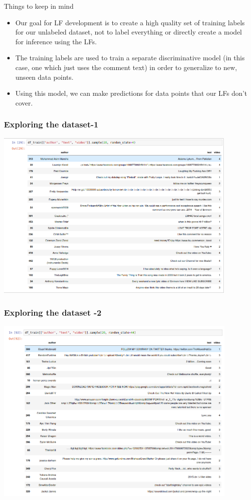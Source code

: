 \documentclass{beamer}
\begin{document}
\begin{frame}{Things to keep in mind}
    \begin{itemize}
        \item Our goal for LF development is to create a high quality set of training labels for our unlabeled dataset, not to label everything or directly create a model for inference using the LFs. \pause
        \item The training labels are used to train a separate discriminative model (in this case, one which just uses the comment text) in order to generalize to new, unseen data points. 
        \item Using this model, we can make predictions for data points that our LFs don't cover.
    \end{itemize}
\end{frame}

\begin{frame}
\frametitle{Exploring the dataset-1}
    \includegraphics[width=0.9\textwidth]{figures/sample1.png}
\end{frame}

\begin{frame}
\frametitle{Exploring the dataset -2}
    \includegraphics[width=0.9\textwidth]{figures/sample2.png}
\end{frame}
\end{document}

